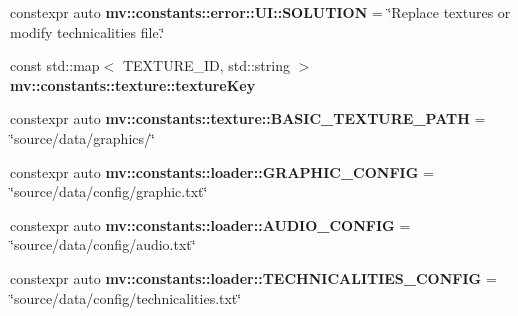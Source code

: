 \begin{DoxyCompactItemize}
\item 
constexpr auto \textbf{ mv\+::constants\+::error\+::\+U\+I\+::\+S\+O\+L\+U\+T\+I\+ON} = \char`\"{}Replace textures or modify \textquotesingle{}technicalities\textquotesingle{} file.\char`\"{}
\item 
const std\+::map$<$ T\+E\+X\+T\+U\+R\+E\+\_\+\+ID, std\+::string $>$ \textbf{ mv\+::constants\+::texture\+::texture\+Key}
\item 
constexpr auto \textbf{ mv\+::constants\+::texture\+::\+B\+A\+S\+I\+C\+\_\+\+T\+E\+X\+T\+U\+R\+E\+\_\+\+P\+A\+TH} = \char`\"{}source/data/graphics/\char`\"{}
\item 
constexpr auto \textbf{ mv\+::constants\+::loader\+::\+G\+R\+A\+P\+H\+I\+C\+\_\+\+C\+O\+N\+F\+IG} = \char`\"{}source/data/config/graphic.\+txt\char`\"{}
\item 
constexpr auto \textbf{ mv\+::constants\+::loader\+::\+A\+U\+D\+I\+O\+\_\+\+C\+O\+N\+F\+IG} = \char`\"{}source/data/config/audio.\+txt\char`\"{}
\item 
constexpr auto \textbf{ mv\+::constants\+::loader\+::\+T\+E\+C\+H\+N\+I\+C\+A\+L\+I\+T\+I\+E\+S\+\_\+\+C\+O\+N\+F\+IG} = \char`\"{}source/data/config/technicalities.\+txt\char`\"{}
\end{DoxyCompactItemize}
